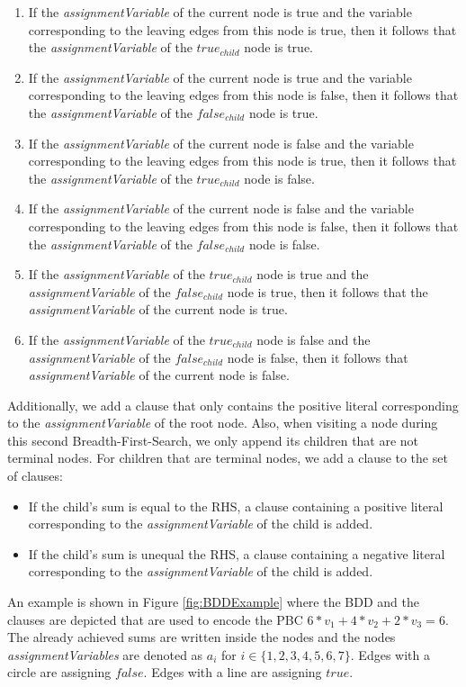 \begin{enumerate}
    \item If the \emph{assignmentVariable} of the current node is true and the variable corresponding to the leaving edges from this node is true, then it follows that the \emph{assignmentVariable} of the $true_{child}$ node is true.
    \item If the \emph{assignmentVariable} of the current node is true and the variable corresponding to the leaving edges from this node is false, then it follows that the \emph{assignmentVariable} of the $false_{child}$ node is true.
    \item If the \emph{assignmentVariable} of the current node is false and the variable corresponding to the leaving edges from this node is true, then it follows that the \emph{assignmentVariable} of the $true_{child}$ node is false.
    \item If the \emph{assignmentVariable} of the current node is false and the variable corresponding to the leaving edges from this node is false, then it follows that the \emph{assignmentVariable} of the $false_{child}$ node is false.
    \item If the \emph{assignmentVariable} of the $true_{child}$ node is true and the \emph{assignmentVariable} of the $false_{child}$ node is true, then it follows that the \emph{assignmentVariable} of the current node is true.
    \item If the \emph{assignmentVariable} of the $true_{child}$ node is false and the \emph{assignmentVariable} of the $false_{child}$ node is false, then it follows that \emph{assignmentVariable} of the current node is false.
\end{enumerate}

Additionally, we add a clause that only contains the positive literal corresponding to the \emph{assignmentVariable} of the root node. Also, when visiting a node during this second Breadth-First-Search, we only append its children that are not terminal nodes. For children that are terminal nodes, we add a clause to the set of clauses: 
\begin{itemize}
    \item If the child's sum is equal to the RHS, a clause containing a positive literal corresponding to the \emph{assignmentVariable} of the child is added.
    \item If the child's sum is unequal the RHS, a clause containing a negative literal corresponding to the \emph{assignmentVariable} of the child is added.
\end{itemize}
An example is shown in Figure \ref{fig:BDDExample} where the BDD and the clauses are depicted that are used to encode the PBC $6*v_1+4*v_2+2*v_3=6$. The already achieved sums are written inside the nodes and the nodes \emph{assignmentVariables} are denoted as $a_i$ for $i\in \{1,2,3,4,5,6,7\}$. Edges with a circle are assigning $false$. Edges with a line are assigning $true$.

